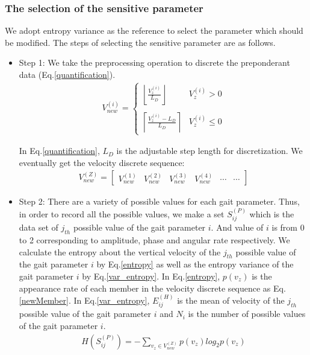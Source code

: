 \subsubsection{The selection of the sensitive parameter}

We adopt entropy variance as the reference to select the parameter which should be modified. The steps of selecting the sensitive parameter are as follows.

\begin{itemize}
	\item Step 1: We take the preprocessing operation to discrete the preponderant data (Eq.\ref{quantification}).
	\begin{eqnarray}\label{quantification}
	V_{new}^{(i)}=\left\{
	\begin{array}{lr}
	\left \lfloor \frac{V_{z}^{(i)}}{L_{D}} \right \rfloor&V_{z}^{(i)}> 0\\
	\\
	\left \lceil \frac{V_{z}^{(i)}-L_{D}}{L_{D}} \right \rceil&V_{z}^{(i)}\leq 0
	\end{array}
	\right.
	\end{eqnarray}
	
	In Eq.\ref{quantification}, $L_{D}$ is the adjustable step length for discretization. We eventually get the velocity discrete sequence:
	\begin{eqnarray}\label{newMember}
	V_{new}^{(Z)}=\begin{bmatrix}
	V_{new}^{(1)} & V_{new}^{(2)} & V_{new}^{(3)} & V_{new}^{(4)} & \cdots & \cdots
	\end{bmatrix}
	\end{eqnarray}
	
	\item Step 2: There are a variety of possible values for each gait parameter. Thus, in order to record all the possible values, we make a set $S_{ij}^{(P)}$ which is the data set of $j_{th}$ possible value of the gait parameter $i$. And value of $i$ is from 0 to 2 corresponding to amplitude, phase and angular rate respectively. We calculate the entropy about the vertical velocity of the $j_{th}$ possible value of the gait parameter $i$ by Eq.\ref{entropy} as well as the entropy variance of the gait parameter $i$ by Eq.\ref{var_entropy}. In Eq.\ref{entropy}, $p(v_{z})$ is the appearance rate of each member in the velocity discrete sequence as Eq.\ref{newMember}. In Eq.\ref{var_entropy}, $E_{ij}^{(H)}$ is the mean of velocity of  the $j_{th}$ possible value of the gait parameter $i$ and $N_{i}$ is the number of possible values of the gait parameter $i$.
	\begin{eqnarray}\label{entropy}
	H(S_{ij}^{(P)})=-\sum _{v_{z}\in V_{new}^{(Z)}}p(v_{z})log_{2}p(v_{z})
	\end{eqnarray}
	

\end{itemize}

